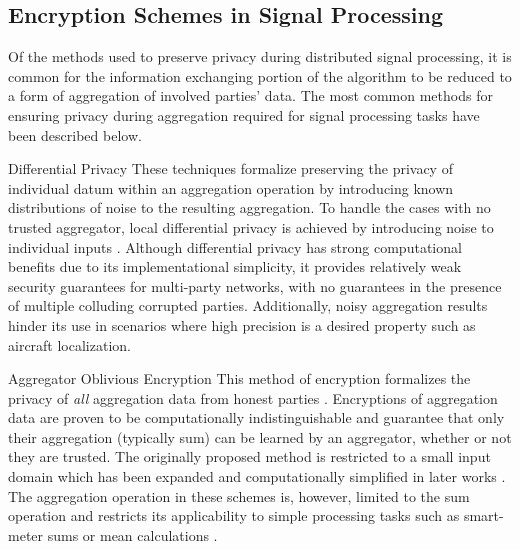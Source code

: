 \documentclass[10pt,letterpaper,oneside,twocolumn,journal]{IEEEtran}
\theoremstyle{definition}
\theoremstyle{definition}
\theoremstyle{remark}
\begin{document}
\subsection{Encryption Schemes in Signal Processing}
Of the methods used to preserve privacy during distributed signal processing, it is common for the information exchanging portion of the algorithm to be reduced to a form of aggregation of involved parties' data. The most common methods for ensuring privacy during aggregation required for signal processing tasks have been described below.
\begin{LaTeXdescription}
    \item[Differential Privacy] These techniques formalize preserving the privacy of individual datum within an aggregation operation by introducing known distributions of noise to the resulting aggregation. To handle the cases with no trusted aggregator, local differential privacy is achieved by introducing noise to individual inputs \cite{hanPrivacyControlDynamical2018,dworkDifferentialPrivacySurvey2008,andresGeoindistinguishabilityDifferentialPrivacy2013}. Although differential privacy has strong computational benefits due to its implementational simplicity, it provides relatively weak security guarantees for multi-party networks, with no guarantees in the presence of multiple colluding corrupted parties. Additionally, noisy aggregation results hinder its use in scenarios where high precision is a desired property such as aircraft localization.
    \item[Aggregator Oblivious Encryption] This method of encryption formalizes the privacy of \textit{all} aggregation data from honest parties \cite{shiPrivacyPreservingAggregationTimeSeries2011,chanPrivacyPreservingStreamAggregation2012,joyeScalableSchemePrivacyPreserving2013}. Encryptions of aggregation data are proven to be computationally indistinguishable and guarantee that only their aggregation (typically sum) can be learned by an aggregator, whether or not they are trusted. The originally proposed method \cite{shiPrivacyPreservingAggregationTimeSeries2011} is restricted to a small input domain which has been expanded and computationally simplified in later works \cite{joyeScalableSchemePrivacyPreserving2013,benhamoudaNewFrameworkPrivacyPreserving2016}. The aggregation operation in these schemes is, however, limited to the sum operation and restricts its applicability to simple processing tasks such as smart-meter sums or mean calculations \cite{chanPrivacyPreservingStreamAggregation2012,benhamoudaNewFrameworkPrivacyPreserving2016}.
\end{LaTeXdescription}
\end{document}
